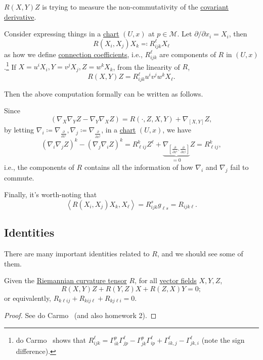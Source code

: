 \begin{intuition}
	\(R(X, Y)Z\) is trying to measure the non-commutativity of the \hyperref[def:covariant-derivative]{covariant derivative}.
\end{intuition}

Consider expressing things in a \hyperref[def:local-coordinate]{chart} \((U, x)\) at \(p\in \mathcal{M} \). Let \(\partial /\partial x_i = X_i\), then
\[
	R(X_i, X_j) X_k \eqqcolon R^{\ell }_{ijk} X_{\ell }
\]
as how we define \hyperref[not:connection-coefficient]{connection coefficients}, i.e., \(R^{\ell }_{ijk} \) are components of \(R\) in \((U, x)\).\footnote{do Carmo~\cite[Page 93]{flaherty2013riemannian} shows that \(R^{\ell }_{ijk} = \Gamma _{ik}^p \Gamma ^\ell _{jp} - \Gamma ^p_{jk} \Gamma ^\ell _{ip} + \Gamma ^\ell _{ik, j} - \Gamma ^\ell _{jk, i}\) (note the sign difference).} If \(X = u^i X_i, Y = v^j X_j, Z = w^k X_k\), from the linearity of \(R\),
\[
	R(X, Y)Z = R^{\ell }_{ijk} u^i v^j w^k X_{\ell }.
\]

Then the above computation formally can be written as follows.

\begin{remark}
	Since
	\[
		\left( \nabla _X \nabla _Y Z - \nabla _Y \nabla _X Z \right) = R(\cdot, Z, X, Y) + \nabla _{[X, Y]} Z,
	\]
	by letting \(\nabla _i \coloneqq \nabla _{\frac{\partial }{\partial x^i} }, \nabla _j \coloneqq \nabla _{\frac{\partial }{\partial x^j} }\), in a \hyperref[def:coordinate-chart]{chart} \((U, x)\), we have
	\[
		(\nabla _i \nabla _j Z)^k - (\nabla _j \nabla _i Z)^k
		= R^k_{\ell ij} Z^{\ell } + \underbrace{\nabla _{\left[ \frac{\partial }{\partial x^i} , \frac{\partial }{\partial x^j}  \right] }}_{=0} Z
		= R^k_{\ell ij},
	\]
	i.e., the components of \(R\) contains all the information of how \(\nabla _i\) and \(\nabla _j\) fail to commute.
\end{remark}

Finally, it's worth-noting that
\[
	\left\langle R(X_i, X_j) X_k, X_{\ell }  \right\rangle = R^{s}_{ijk} g_{\ell s} = R_{i j k \ell }.
\]

\subsection{Identities}
There are many important identities related to \(R\), and we should see some of them.

\begin{proposition}\label{prop:1st-Bianchi-identity}
	Given the \hyperref[def:Riemannian-curvature]{Riemannian curvature tensor} \(R\), for all \hyperref[def:vector-field]{vector fields} \(X, Y, Z\),
	\[
		R(X, Y)Z + R(Y, Z)X + R(Z, X)Y = 0;
	\]
	or equivalently, \(R_{k \ell i j} + R_{k ij \ell } + R_{k j \ell i} = 0\).
\end{proposition}
\begin{proof}
	See do Carmo~\cite[Proposition 2.4]{flaherty2013riemannian} (and also homework 2).
\end{proof}


